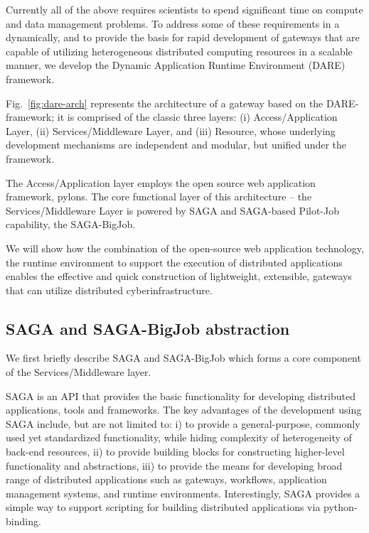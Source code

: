 \documentclass{sig-alternate}
\begin{document}

Currently all of the above requires scientists to spend significant
time on compute and data management problems.  To address some of
these requirements in a dynamically, and to provide the basis for
rapid development of gateways that are capable of utilizing
heterogeneous distributed computing resources in a scalable manner, we
develop the Dynamic Application Runtime Environment (DARE)
framework\cite{dareurl}.

Fig.~\ref{fig:dare-arch} represents the architecture of a gateway
based on the DARE-framework; it is comprised of the classic three
layers: (i) Access/Application Layer, (ii) Services/Middleware Layer,
and (iii) Resource, whose underlying development mechanisms are
independent and modular, but unified under the framework.

The Access/Application layer employs the open source web application
framework, pylons\cite{pylonsurl}.  The core functional layer of this
architecture -- the Services/Middleware Layer is powered by SAGA and
SAGA-based Pilot-Job capability, the
SAGA-BigJob\cite{saga-ccgrid10}. %

We will show how the combination of the open-source web application
technology, the runtime environment to support the execution of
distributed applications enables the effective and quick construction
of lightweight, extensible, gateways that can utilize
distributed cyberinfrastructure. 


\subsection{SAGA and SAGA-BigJob abstraction}

We first briefly describe SAGA and SAGA-BigJob which forms a core
component of the Services/Middleware layer.
 
SAGA is an API that provides the basic functionality for developing
distributed applications, tools and frameworks\cite{saga_url}. The key
advantages of the development using SAGA include, but are not limited
to: i) to provide a general-purpose, commonly used yet standardized
functionality, while hiding complexity of heterogeneity of back-end
resources, ii) to provide building blocks for constructing
higher-level functionality and abstractions, iii) to provide the means
for developing broad range of distributed applications such as
gateways, workflows, application management systems, and runtime
environments.  Interestingly, SAGA provides a simple way to support
scripting for building distributed applications via python-binding.
\end{document}
